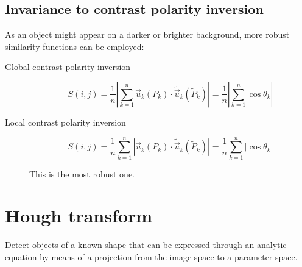 \subsection{Invariance to contrast polarity inversion}

As an object might appear on a darker or brighter background, more robust similarity functions can be employed:
\begin{description}
    \item[Global contrast polarity inversion] 
        \[ S(i, j) = \frac{1}{n} \left\vert \sum_{k=1}^{n} \vec{u}_k(P_k) \cdot \tilde{\vec{u}}_k(\tilde{P}_k) \right\vert = 
            \frac{1}{n} \left\vert \sum_{k=1}^{n} \cos \theta_k \right\vert \]

    \item[Local contrast polarity inversion] 
        \[ S(i, j) = \frac{1}{n} \sum_{k=1}^{n} \left\vert  \vec{u}_k(P_k) \cdot \tilde{\vec{u}}_k(\tilde{P}_k) \right\vert = 
        \frac{1}{n} \sum_{k=1}^{n} \left\vert \cos \theta_k \right\vert \]

        \begin{remark}
            This is the most robust one.
        \end{remark}
\end{description}



\section{Hough transform}

Detect objects of a known shape that can be expressed through an analytic equation 
by means of a projection from the image space to a parameter space.


